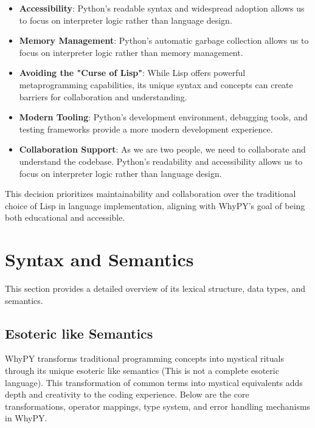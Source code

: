 \documentclass[conference]{IEEEtran}
\begin{document}
\begin{itemize}
    \item \textbf{Accessibility}: Python's readable syntax and widespread adoption allows us to focus on interpreter logic rather than language design.
    
    \item \textbf{Memory Management}: Python's automatic garbage collection allows us to focus on interpreter logic rather than memory management.
    
    \item \textbf{Avoiding the "Curse of Lisp"}: While Lisp offers powerful metaprogramming capabilities, its unique syntax and concepts can create barriers for collaboration and understanding.
    
    \item \textbf{Modern Tooling}: Python's development environment, debugging tools, and testing frameworks provide a more modern development experience.
    
    \item \textbf{Collaboration Support}: As we are two people, we need to collaborate and understand the codebase. Python's readability and accessibility allows us to focus on interpreter logic rather than language design.
\end{itemize}

This decision prioritizes maintainability and collaboration over the traditional choice of Lisp in language implementation, aligning with WhyPY's goal of being both educational and accessible.


\section{Syntax and Semantics}
This section provides a detailed overview of its lexical structure, data types, and semantics.


\subsection{Esoteric like Semantics}
WhyPY transforms traditional programming concepts into mystical rituals through its unique esoteric like semantics (This is not a complete esoteric language). This transformation of common terms into mystical equivalents adds depth and creativity to the coding experience. Below are the core transformations, operator mappings, type system, and error handling mechanisms in WhyPY.
\end{document}
